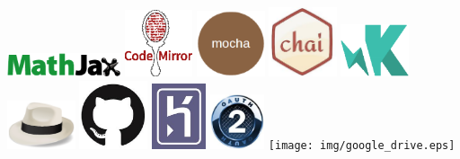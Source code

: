 \documentclass{beamer}
\begin{document}
\begin{frame}
  \includegraphics[width=0.25\textwidth]{img/mathjax.eps}
  \newline
  \newline
  \includegraphics[width=0.15\textwidth]{img/codemirror.eps}
  \hspace*{1.2cm}
  \includegraphics[width=0.15\textwidth]{img/mocha.eps}
  \hspace*{1.2cm}
  \includegraphics[width=0.15\textwidth]{img/chai.eps}
  \hspace*{1.2cm}
  \includegraphics[width=0.15\textwidth]{img/karma.eps}
  \newline
  \newline
  \includegraphics[width=0.15\textwidth]{img/sinatra.eps}
  \hspace*{1.0cm}
  \includegraphics[width=0.15\textwidth]{img/github.eps}
  \hspace*{1.0cm}
  \includegraphics[width=0.12\textwidth]{img/heroku.eps}
  \hspace*{1.0cm}
  \includegraphics[width=0.12\textwidth]{img/oauth.eps}
  \hspace*{1.0cm}
  \texttt{[image: img/google\_drive.eps]}
\end{frame}
\end{document}

